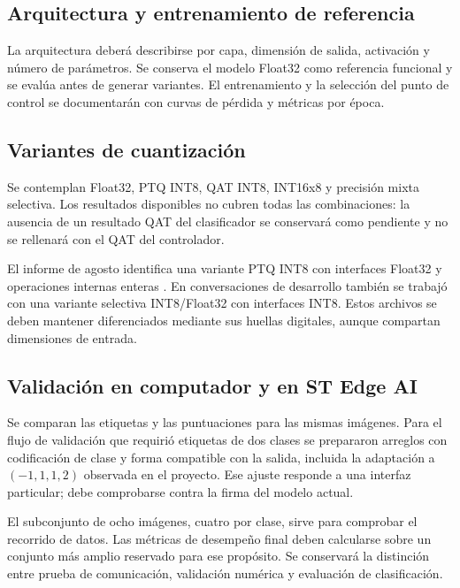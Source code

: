 \subsection{Arquitectura y entrenamiento de referencia}
La arquitectura deberá describirse por capa, dimensión de salida, activación y número de parámetros. Se conserva el modelo Float32 como referencia funcional y se evalúa antes de generar variantes. El entrenamiento y la selección del punto de control se documentarán con curvas de pérdida y métricas por época.

\subsection{Variantes de cuantización}
Se contemplan Float32, PTQ INT8, QAT INT8, INT16x8 y precisión mixta selectiva. Los resultados disponibles no cubren todas las combinaciones: la ausencia de un resultado QAT del clasificador se conservará como pendiente y no se rellenará con el QAT del controlador.

El informe de agosto identifica una variante PTQ INT8 con interfaces Float32 y operaciones internas enteras \cite{avance2026}. En conversaciones de desarrollo también se trabajó con una variante selectiva INT8/Float32 con interfaces INT8. Estos archivos se deben mantener diferenciados mediante sus huellas digitales, aunque compartan dimensiones de entrada.

\subsection{Validación en computador y en ST Edge AI}
Se comparan las etiquetas y las puntuaciones para las mismas imágenes. Para el flujo de validación que requirió etiquetas de dos clases se prepararon arreglos con codificación de clase y forma compatible con la salida, incluida la adaptación a $(-1,1,1,2)$ observada en el proyecto. Ese ajuste responde a una interfaz particular; debe comprobarse contra la firma del modelo actual.

El subconjunto de ocho imágenes, cuatro por clase, sirve para comprobar el recorrido de datos. Las métricas de desempeño final deben calcularse sobre un conjunto más amplio reservado para ese propósito. Se conservará la distinción entre prueba de comunicación, validación numérica y evaluación de clasificación.

